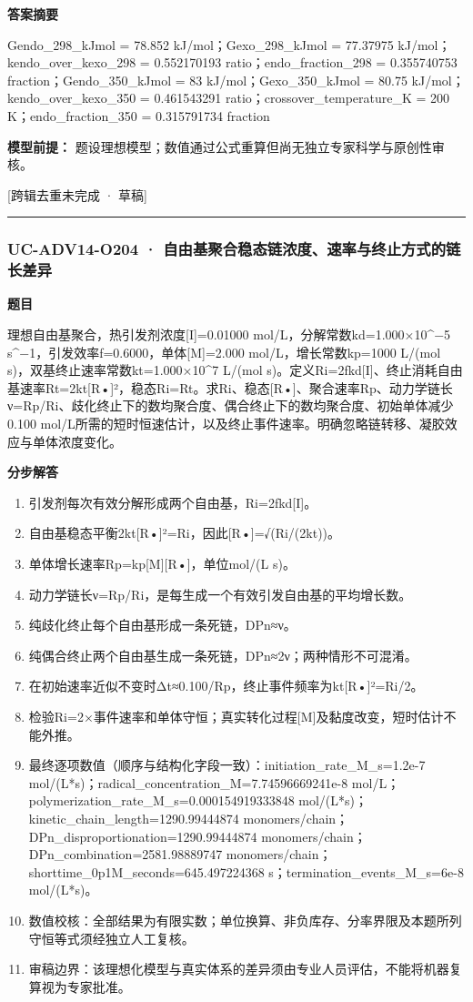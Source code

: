 \documentclass[UTF8,11pt,a4paper]{ctexart}
\begin{document}
\noindent\textbf{答案摘要}\par
Gendo\_298\_kJmol = 78.852 kJ/mol；Gexo\_298\_kJmol = 77.37975 kJ/mol；kendo\_over\_kexo\_298 = 0.552170193 ratio；endo\_fraction\_298 = 0.355740753 fraction；Gendo\_350\_kJmol = 83 kJ/mol；Gexo\_350\_kJmol = 80.75 kJ/mol；kendo\_over\_kexo\_350 = 0.461543291 ratio；crossover\_temperature\_K = 200 K；endo\_fraction\_350 = 0.315791734 fraction\par
\noindent\textbf{模型前提：}
题设理想模型；数值通过公式重算但尚无独立专家科学与原创性审核。\par
\noindent\textcolor{red!65!black}{[跨辑去重未完成 · 草稿]} \par
\medskip\hrule\medskip
{}
\subsubsection*{UC-ADV14-O204 · 自由基聚合稳态链浓度、速率与终止方式的链长差异}
\noindent\textbf{题目}\par
理想自由基聚合，热引发剂浓度[I]=0.01000 mol/L，分解常数kd=1.000×10\textasciicircum{}−5 s\textasciicircum{}−1，引发效率f=0.6000，单体[M]=2.000 mol/L，增长常数kp=1000 L/(mol s)，双基终止速率常数kt=1.000×10\textasciicircum{}7 L/(mol s)。定义Ri=2fkd[I]、终止消耗自由基速率Rt=2kt[R•]²，稳态Ri=Rt。求Ri、稳态[R•]、聚合速率Rp、动力学链长ν=Rp/Ri、歧化终止下的数均聚合度、偶合终止下的数均聚合度、初始单体减少0.100 mol/L所需的短时恒速估计，以及终止事件速率。明确忽略链转移、凝胶效应与单体浓度变化。\par
\medskip\noindent\textbf{分步解答}
\begin{enumerate}
\item 引发剂每次有效分解形成两个自由基，Ri=2fkd[I]。
\item 自由基稳态平衡2kt[R•]²=Ri，因此[R•]=√(Ri/(2kt))。
\item 单体增长速率Rp=kp[M][R•]，单位mol/(L s)。
\item 动力学链长ν=Rp/Ri，是每生成一个有效引发自由基的平均增长数。
\item 纯歧化终止每个自由基形成一条死链，DPn≈ν。
\item 纯偶合终止两个自由基生成一条死链，DPn≈2ν；两种情形不可混淆。
\item 在初始速率近似不变时Δt≈0.100/Rp，终止事件频率为kt[R•]²=Ri/2。
\item 检验Ri=2×事件速率和单体守恒；真实转化过程[M]及黏度改变，短时估计不能外推。
\item 最终逐项数值（顺序与结构化字段一致）：initiation\_rate\_M\_s=1.2e-7 mol/(L*s)；radical\_concentration\_M=7.74596669241e-8 mol/L；polymerization\_rate\_M\_s=0.000154919333848 mol/(L*s)；kinetic\_chain\_length=1290.99444874 monomers/chain；DPn\_disproportionation=1290.99444874 monomers/chain；DPn\_combination=2581.98889747 monomers/chain；shorttime\_0p1M\_seconds=645.497224368 s；termination\_events\_M\_s=6e-8 mol/(L*s)。
\item 数值校核：全部结果为有限实数；单位换算、非负库存、分率界限及本题所列守恒等式须经独立人工复核。
\item 审稿边界：该理想化模型与真实体系的差异须由专业人员评估，不能将机器复算视为专家批准。
\end{enumerate}
\end{document}
